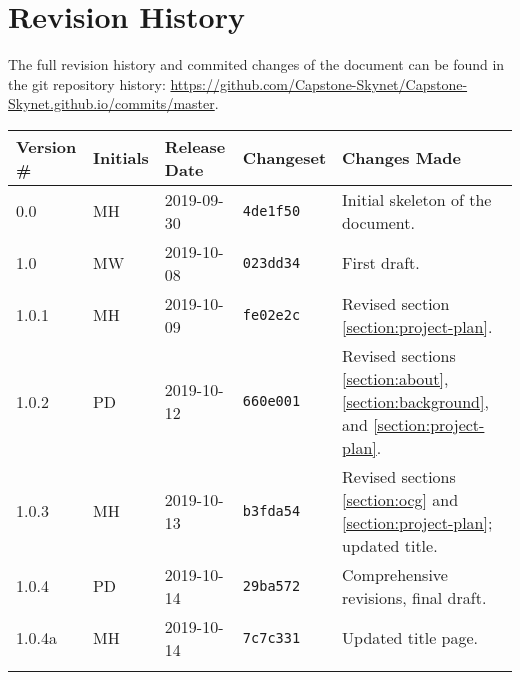 \thispagestyle{empty}
\section*{Revision History}
The full revision history and commited changes of the document can be found in the git repository history: \href{https://github.com/Capstone-Skynet/Capstone-Skynet.github.io}{https://github.com/Capstone-Skynet/Capstone-Skynet.github.io/commits/master}.

\begin{table}[H]
\begin{tabular}{*{5}{l}}
\hline
Version \# & Initials & Release Date & Changeset & Changes Made \\ \hline

0.0 & MH & 2019-09-30 & \texttt{4de1f50} & Initial skeleton of the document.\\
1.0 & MW & 2019-10-08 & \texttt{023dd34} & First draft.\\
1.0.1 & MH & 2019-10-09 & \texttt{fe02e2c} & Revised section \ref{section:project-plan}.\\
1.0.2 & PD & 2019-10-12 & \texttt{660e001} & Revised sections \ref{section:about}, \ref{section:background}, and \ref{section:project-plan}.\\
1.0.3 & MH & 2019-10-13 & \texttt{b3fda54} & Revised sections \ref{section:ocg} and \ref{section:project-plan}; updated title.\\
1.0.4 & PD & 2019-10-14 & \texttt{29ba572} & Comprehensive revisions, final draft.\\
1.0.4a & MH & 2019-10-14 & \texttt{7c7c331} & Updated title page. \\

 & & & \\ \hline
\end{tabular}
\end{table}
